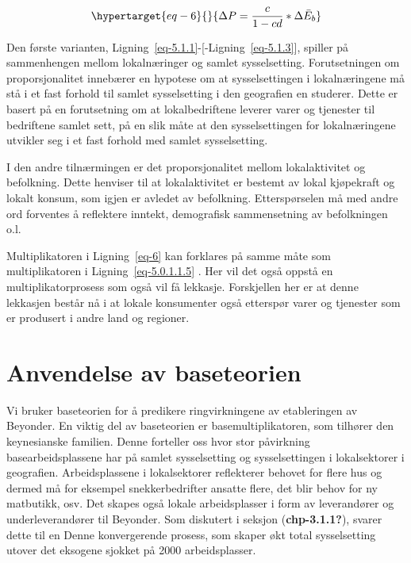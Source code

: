 \documentclass[
]{article}
\begin{document}
\begin{equation}\protect\hypertarget{eq-6}{}{
\Delta{P}=\frac{c}{1-cd}*\Delta\bar{E}_b
}\label{eq-6}\end{equation}

Den første varianten,
Ligning~\ref{eq-5.1.1}-{[}-Ligning~\ref{eq-5.1.3}{]}, spiller på
sammenhengen mellom lokalnæringer og samlet sysselsetting.
Forutsetningen om proporsjonalitet innebærer en hypotese om at
sysselsettingen i lokalnæringene må stå i et fast forhold til samlet
sysselsetting i den geografien en studerer. Dette er basert på en
forutsetning om at lokalbedriftene leverer varer og tjenester til
bedriftene samlet sett, på en slik måte at den sysselsettingen for
lokalnæringene utvikler seg i et fast forhold med samlet sysselsetting.

I den andre tilnærmingen er det proporsjonalitet mellom lokalaktivitet
og befolkning. Dette henviser til at lokalaktivitet er bestemt av lokal
kjøpekraft og lokalt konsum, som igjen er avledet av befolkning.
Etterspørselen må med andre ord forventes å reflektere inntekt,
demografisk sammensetning av befolkningen o.l.

Multiplikatoren i Ligning~\ref{eq-6} kan forklares på samme måte som
multiplikatoren i Ligning~\ref{eq-5.0.1.1.5} . Her vil det også oppstå
en multiplikatorprosess som også vil få lekkasje. Forskjellen her er at
denne lekkasjen består nå i at lokale konsumenter også etterspør varer
og tjenester som er produsert i andre land og regioner.

\newpage

\hypertarget{anvendelse-av-baseteorien}{%
\section{Anvendelse av baseteorien}\label{anvendelse-av-baseteorien}}

Vi bruker baseteorien for å predikere ringvirkningene av etableringen av
Beyonder. En viktig del av baseteorien er basemultiplikatoren, som
tilhører den keynesianske familien. Denne forteller oss hvor stor
påvirkning basearbeidsplassene har på samlet sysselsetting og
sysselsettingen i lokalsektorer i geografien. Arbeidsplassene i
lokalsektorer reflekterer behovet for flere hus og dermed må for
eksempel snekkerbedrifter ansatte flere, det blir behov for ny
matbutikk, osv. Det skapes også lokale arbeidsplasser i form av
leverandører og underleverandører til Beyonder. Som diskutert i seksjon
(\textbf{chp-3.1.1?}), svarer dette til en Denne konvergerende prosess,
som skaper økt total sysselsetting utover det eksogene sjokket på 2000
arbeidsplasser.
\end{document}
